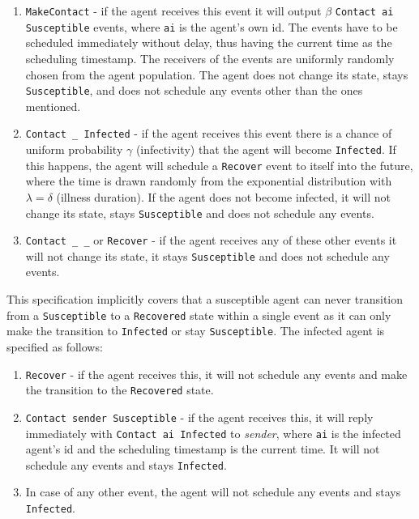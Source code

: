 \begin{enumerate}
	\item \texttt{MakeContact} - if the agent receives this event it will output $\beta$ \texttt{Contact ai Susceptible} events, where \texttt{ai} is the agent's own id. The events have to be scheduled immediately without delay, thus having the current time as the scheduling timestamp. The receivers of the events are uniformly randomly chosen from the agent population. The agent does not change its state, stays \texttt{Susceptible}, and does not schedule any events other than the ones mentioned.
	
	\item \texttt{Contact \_ Infected} - if the agent receives this event there is a chance of uniform probability $\gamma$ (infectivity) that the agent will become \texttt{Infected}. If this happens, the agent will schedule a \texttt{Recover} event to itself into the future, where the time is drawn randomly from the exponential distribution with $\lambda = \delta$ (illness duration). If the agent does not become infected, it will not change its state, stays \texttt{Susceptible} and does not schedule any events.
	
	\item \texttt{Contact \_ \_} or \texttt{Recover} - if the agent receives any of these other events it will not change its state, it stays \texttt{Susceptible} and does not schedule any events.
\end{enumerate}

This specification implicitly covers that a susceptible agent can never transition from a \texttt{Susceptible} to a \texttt{Recovered} state within a single event as it can only make the transition to \texttt{Infected} or stay \texttt{Susceptible}. The infected agent is specified as follows:

\begin{enumerate}
	\item \texttt{Recover} - if the agent receives this, it will not schedule any events and make the transition to the \texttt{Recovered} state.
	
	\item \texttt{Contact sender Susceptible} - if the agent receives this, it will reply immediately with \texttt{Contact ai Infected} to \textit{sender}, where \texttt{ai} is the infected agent's id and the scheduling timestamp is the current time. It will not schedule any events and stays \texttt{Infected}.
	
	\item In case of any other event, the agent will not schedule any events and stays \texttt{Infected}.
\end{enumerate}

